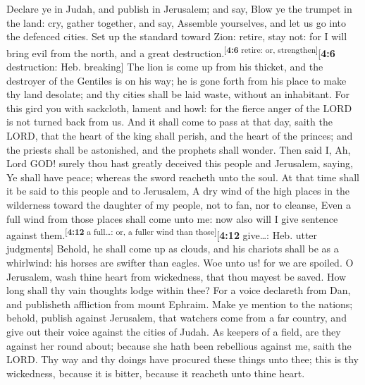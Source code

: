  Declare ye in Judah, and publish in Jerusalem; and say,
Blow ye the trumpet in the land: cry, gather together, and say, Assemble
yourselves, and let us go into the defenced cities.  Set
up the standard toward Zion: retire, stay not: for I will bring evil
from the north, and a great destruction.\textsuperscript{{[}\textbf{4:6}
retire: or, strengthen{]}}{[}\textbf{4:6} destruction: Heb. breaking{]}
 The lion is come up from his thicket, and the destroyer
of the Gentiles is on his way; he is gone forth from his place to make
thy land desolate; and thy cities shall be laid waste, without an
inhabitant.  For this gird you with sackcloth, lament and
howl: for the fierce anger of the LORD is not turned back from us.
 And it shall come to pass at that day, saith the LORD,
that the heart of the king shall perish, and the heart of the princes;
and the priests shall be astonished, and the prophets shall wonder.
 Then said I, Ah, Lord GOD! surely thou hast greatly
deceived this people and Jerusalem, saying, Ye shall have peace; whereas
the sword reacheth unto the soul.  At that time shall it
be said to this people and to Jerusalem, A dry wind of the high places
in the wilderness toward the daughter of my people, not to fan, nor to
cleanse,  Even a full wind from those places shall come
unto me: now also will I give sentence against
them.\textsuperscript{{[}\textbf{4:12} a full\ldots: or, a fuller wind
than those{]}}{[}\textbf{4:12} give\ldots: Heb. utter judgments{]}
 Behold, he shall come up as clouds, and his chariots
shall be as a whirlwind: his horses are swifter than eagles. Woe unto
us! for we are spoiled.  O Jerusalem, wash thine heart
from wickedness, that thou mayest be saved. How long shall thy vain
thoughts lodge within thee?  For a voice declareth from
Dan, and publisheth affliction from mount Ephraim.  Make
ye mention to the nations; behold, publish against Jerusalem, that
watchers come from a far country, and give out their voice against the
cities of Judah.  As keepers of a field, are they against
her round about; because she hath been rebellious against me, saith the
LORD.  Thy way and thy doings have procured these things
unto thee; this is thy wickedness, because it is bitter, because it
reacheth unto thine heart.

